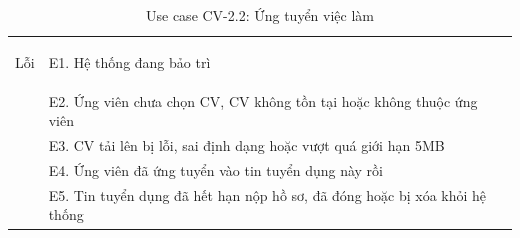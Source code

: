 \begin{table}[H]
\begin{tabularx}{\textwidth}{|
        >{\bfseries\raggedright\arraybackslash}p{3.2cm}|Y|}
        Lỗi
        & E1. Hệ thống đang bảo trì\\
        & E2. Ứng viên chưa chọn CV, CV không tồn tại hoặc không thuộc ứng viên\\
        & E3. CV tải lên bị lỗi, sai định dạng hoặc vượt quá giới hạn 5MB\\
        & E4. Ứng viên đã ứng tuyển vào tin tuyển dụng này rồi\\
        & E5. Tin tuyển dụng đã hết hạn nộp hồ sơ, đã đóng hoặc bị xóa khỏi hệ thống\\
        \hline

    \end{tabularx}

    \caption{Use case CV-2.2: Ứng tuyển việc làm}
    \label{tab:usecase-cv22}
\end{table}

